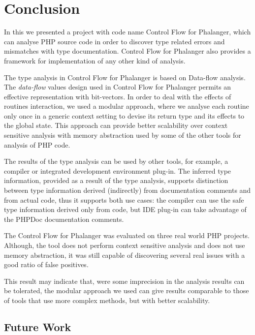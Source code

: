 \chapter{Conclusion}
\label{conclusion}
    In this \wthesis{} we presented a project with code name 
    Control Flow for Phalanger, which can analyse PHP 
    source code in order to discover type related errors 
    and mismatches with type documentation. Control Flow 
    for Phalanger also provides a framework for 
    implementation of any other kind of analysis.
    
    The type analysis in Control Flow for Phalanger 
    is based on Data-flow analysis. The \emph{data-flow} 
    values design used in Control Flow for Phalanger 
    permits an effective representation with bit-vectors.
    In order to deal with the effects of routines 
    interaction, we used a modular approach, where 
    we analyse each routine only once in a generic 
    context setting to devise its return type and its 
    effects to the global state. This approach 
    can provide better scalability over 
    context sensitive analysis with memory 
    abstraction used by some of the other tools 
    for analysis of PHP code.
    
    The results of the type analysis can be used 
    by other tools, for example, a compiler or 
    integrated development environment plug-in. 
    The inferred type information, provided as 
    a result of the type analysis, supports 
    distinction between type information derived 
    (indirectly) from documentation comments and 
    from actual code, thus it supports both 
    use cases: the compiler can use the safe 
    type information derived only from code, 
    but IDE plug-in can take advantage of the 
    PHPDoc documentation comments.
    
    The Control Flow for Phalanger was evaluated on 
    three real world PHP projects. Although, the tool 
    does not perform context sensitive analysis and 
    does not use memory abstraction, it was still 
    capable of discovering several real issues with 
    a good ratio of false positives.
    
    This result may indicate that, were some imprecision 
    in the analysis results can be tolerated, the 
    modular approach we used can give results comparable 
    to those of tools that use more complex methods, 
    but with better scalability.

    \section{Future Work}
    
